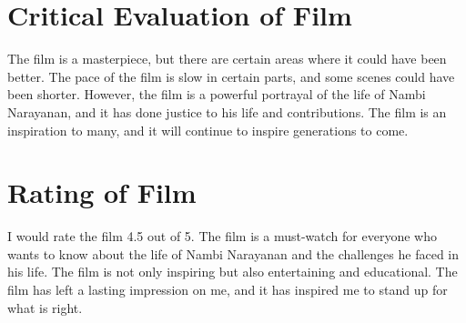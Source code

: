 \documentclass[11pt]{article}
\begin{document}
\section{Critical Evaluation of Film}

The film is a masterpiece, but there are certain areas where it could have been better. The pace of the film is slow in certain parts, and some scenes could have been shorter. However, the film is a powerful portrayal of the life of Nambi Narayanan, and it has done justice to his life and contributions. The film is an inspiration to many, and it will continue to inspire generations to come.

\section{Rating of Film}
I would rate the film 4.5 out of 5. The film is a must-watch for everyone who wants to know about the life of Nambi Narayanan and the challenges he faced in his life. The film is not only inspiring but also entertaining and educational. The film has left a lasting impression on me, and it has inspired me to stand up for what is right.
\end{document}
